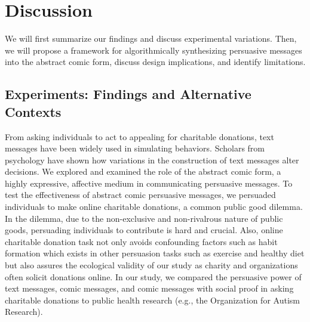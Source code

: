 \section{Discussion}
\label{sec:Discussion}
We will first summarize our findings and discuss experimental variations. Then, we will propose a framework for algorithmically synthesizing persuasive messages into the abstract comic form, discuss design implications, and identify limitations.

\subsection{Experiments: Findings and Alternative Contexts}
\label{sub:Experiments: Findings and Alternate Contexts}

From asking individuals to act to appealing for charitable donations, text messages have been widely used in simulating behaviors. Scholars from psychology have shown how variations in the construction of text messages alter decisions. We explored and examined the role of the abstract comic form, a highly expressive, affective medium in communicating persuasive messages. To test the effectiveness of abstract comic persuasive messages, we persuaded individuals to make online charitable donations, a common public good dilemma. In the dilemma, due to the non-exclusive and non-rivalrous nature of public goods, persuading individuals to contribute is hard and crucial. Also, online charitable donation task not only avoids confounding factors such as habit formation which exists in other persuasion tasks such as exercise and healthy diet but also assures the ecological validity of our study as charity and organizations often solicit donations online. In our study, we compared the persuasive power of text messages, comic messages, and comic messages with social proof in asking charitable donations to public health research (e.g., the Organization for Autism Research).

